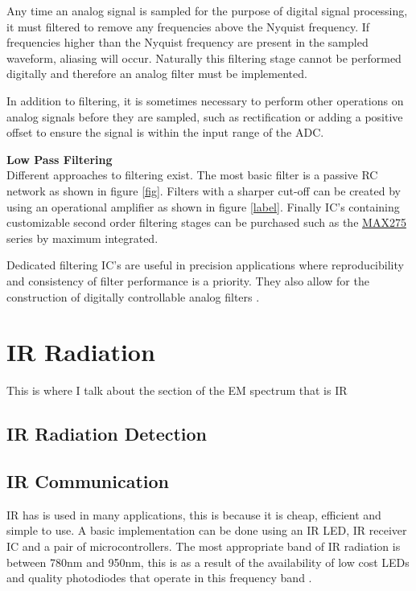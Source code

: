 Any time an analog signal is sampled for the purpose of digital signal processing, it must filtered to remove any frequencies above the Nyquist frequency. If frequencies higher than the Nyquist frequency are present in the sampled waveform, aliasing will occur. Naturally this filtering stage cannot be performed digitally and therefore an analog filter must be implemented.

In addition to filtering, it is sometimes necessary to perform other operations on analog signals before they are sampled, such as rectification or adding a positive offset to ensure the signal is within the input range of the ADC.

\textbf{Low Pass Filtering}\\
Different approaches to filtering exist. The most basic filter is a passive RC network as shown in figure \ref{fig}. Filters with a sharper cut-off can be created by using an operational amplifier as shown in figure \ref{label}. Finally IC's containing customizable second order filtering stages can be purchased such as the \href{https://www.maximintegrated.com/en/products/analog/analog-filters/MAX275.html/tb_tab0}{MAX275} series by maximum integrated.


Dedicated filtering IC's are useful in precision applications where reproducibility and consistency of filter performance is a priority. They also allow for the construction of digitally controllable analog filters \cite{Huijing2010}.


\section{IR Radiation}
This is where I talk about the section of the EM spectrum that is IR


\subsection{IR Radiation Detection}


\subsection{IR Communication}

IR has is used in many applications, this is because it is cheap, efficient and simple to use. A basic implementation can be done using an IR LED, IR receiver IC and a pair of microcontrollers. The most appropriate band of IR radiation is between 780nm and 950nm, this is as a result of the availability of low cost LEDs and quality photodiodes that operate in this frequency band \cite{Elgala2011}.

